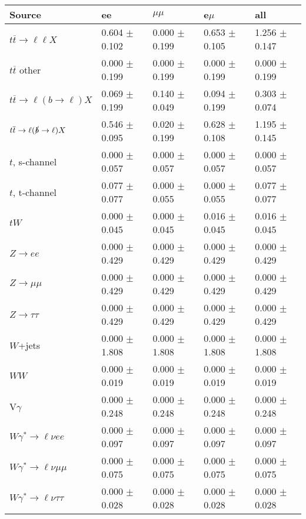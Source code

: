 \begin{tabular}{l | l l l l}
\hline\hline
 Source  &  ee  &  $\mu\mu$  &  e$\mu$  &  all \\
\hline
$t\overline{t}\rightarrow \ell\ell X$ &  0.604 $\pm$  0.102 &  0.000 $\pm$  0.199 &  0.653 $\pm$  0.105 &  1.256 $\pm$  0.147\\
$t\overline{t}$ other &  0.000 $\pm$  0.199 &  0.000 $\pm$  0.199 &  0.000 $\pm$  0.199 &  0.000 $\pm$  0.199\\
$t\overline{t}\rightarrow \ell(b\rightarrow \ell)X$ &  0.069 $\pm$  0.199 &  0.140 $\pm$  0.049 &  0.094 $\pm$  0.199 &  0.303 $\pm$  0.074\\
$t\overline{t}\rightarrow \ell(\slashed{b}\rightarrow \ell)X$ &  0.546 $\pm$  0.095 &  0.020 $\pm$  0.199 &  0.628 $\pm$  0.108 &  1.195 $\pm$  0.145\\
\hline
$t$, s-channel &  0.000 $\pm$  0.057 &  0.000 $\pm$  0.057 &  0.000 $\pm$  0.057 &  0.000 $\pm$  0.057\\
$t$, t-channel &  0.077 $\pm$  0.077 &  0.000 $\pm$  0.055 &  0.000 $\pm$  0.055 &  0.077 $\pm$  0.077\\
$tW$ &  0.000 $\pm$  0.045 &  0.000 $\pm$  0.045 &  0.016 $\pm$  0.045 &  0.016 $\pm$  0.045\\
\hline
$Z\rightarrow ee$ &  0.000 $\pm$  0.429 &  0.000 $\pm$  0.429 &  0.000 $\pm$  0.429 &  0.000 $\pm$  0.429\\
$Z\rightarrow\mu\mu$ &  0.000 $\pm$  0.429 &  0.000 $\pm$  0.429 &  0.000 $\pm$  0.429 &  0.000 $\pm$  0.429\\
$Z\rightarrow\tau\tau$ &  0.000 $\pm$  0.429 &  0.000 $\pm$  0.429 &  0.000 $\pm$  0.429 &  0.000 $\pm$  0.429\\
$W$+jets &  0.000 $\pm$  1.808 &  0.000 $\pm$  1.808 &  0.000 $\pm$  1.808 &  0.000 $\pm$  1.808\\
$WW$ &  0.000 $\pm$  0.019 &  0.000 $\pm$  0.019 &  0.000 $\pm$  0.019 &  0.000 $\pm$  0.019\\
\hline
V$\gamma$ &  0.000 $\pm$  0.248 &  0.000 $\pm$  0.248 &  0.000 $\pm$  0.248 &  0.000 $\pm$  0.248\\
$W\gamma^{*}\rightarrow\ell\nu e e$ &  0.000 $\pm$  0.097 &  0.000 $\pm$  0.097 &  0.000 $\pm$  0.097 &  0.000 $\pm$  0.097\\
$W\gamma^{*}\rightarrow\ell\nu\mu\mu$ &  0.000 $\pm$  0.075 &  0.000 $\pm$  0.075 &  0.000 $\pm$  0.075 &  0.000 $\pm$  0.075\\
$W\gamma^{*}\rightarrow\ell\nu\tau\tau$ &  0.000 $\pm$  0.028 &  0.000 $\pm$  0.028 &  0.000 $\pm$  0.028 &  0.000 $\pm$  0.028\\

\end{tabular}
